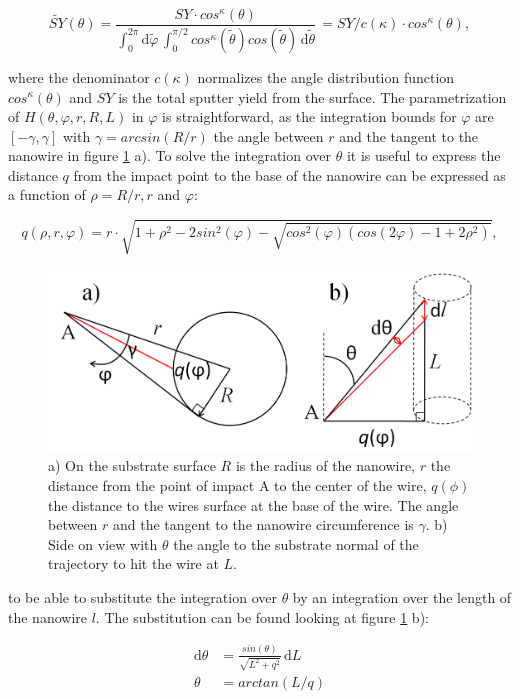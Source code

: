 \begin{equation}
\tilde{SY}(\theta) = \frac{SY \cdot cos^\kappa(\theta)}{\int_0^{2\pi} \! \mathrm{d}\tilde\varphi \,\int_0^{\pi/2} \! cos^\kappa(\tilde\theta) cos(\tilde\theta)\,  \mathrm{d}\tilde\theta} \, = SY /c(\kappa) \cdot cos^\kappa(\theta) ,
\end{equation}

where the denominator $c(\kappa)$ normalizes the angle distribution function $cos^\kappa(\theta)$ and $SY$ is the total sputter yield from the surface. The parametrization of $H(\theta,\varphi,r,R,L)$ in $\varphi$ is straightforward, as the integration bounds for $\varphi$ are $[-\gamma, \gamma]$ with $\gamma = arcsin(R/r)$ the angle between $r$ and the tangent to the nanowire in figure \ref{anglesredepo} a). To solve the integration over $\theta$ it is useful to express the distance $q$ from the impact point to the base of the nanowire can be expressed as a function of $\rho = R/r, r$ and $\varphi$:

\begin{equation}
q(\rho,r,\varphi) = r\cdot \sqrt{1 + \rho^2 - 2sin^2(\varphi) - \sqrt{cos^2(\varphi)(cos(2\varphi) - 1 + 2\rho^2)}},
\end{equation}

\begin{figure}
	\centering
		\includegraphics[width=.6\textwidth]{images/anglesredeposition.jpg}
	\caption{a) On the substrate surface $R$ is the radius of the nanowire, $r$ the distance from the point of impact A to the center of the wire, $q(\phi)$ the distance to the wires surface at the base of the wire. The angle between $r$ and the tangent to the nanowire circumference is $\gamma$. b) Side on view with $\theta$ the angle to the substrate normal of the trajectory to hit the wire at $L$.} 
	\label{anglesredepo}
\end{figure} 

to be able to substitute the integration over $\theta$ by an integration over the length of the nanowire $l$. The substitution can be found looking at figure \ref{anglesredepo} b):

\begin{align*}
\mathrm{d}\theta &= \frac{sin(\theta)}{\sqrt{L^2 + q^2}}\,\mathrm{d}L\\
\theta &= arctan(L/q)
\end{align*}

